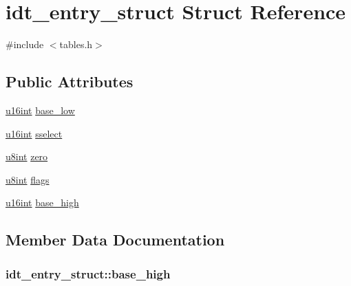 \hypertarget{structidt__entry__struct}{}\section{idt\+\_\+entry\+\_\+struct Struct Reference}
\label{structidt__entry__struct}


{\ttfamily \#include $<$tables.\+h$>$}

\subsection*{Public Attributes}
\begin{DoxyCompactItemize}
\item 
\hyperlink{system_8h_a863d9497073aad2b991aeab2211d87af}{u16int} \hyperlink{structidt__entry__struct_aefa75d6bfe07f1f544393b4dbccb3e76}{base\+\_\+low}
\item 
\hyperlink{system_8h_a863d9497073aad2b991aeab2211d87af}{u16int} \hyperlink{structidt__entry__struct_a85254c7df6a612f4a4b3bb470ff3370c}{sselect}
\item 
\hyperlink{system_8h_a1026e682ffdadc1701c42cd44ce9efcf}{u8int} \hyperlink{structidt__entry__struct_a0d33c8509ae77d42e680d8d11b4c8035}{zero}
\item 
\hyperlink{system_8h_a1026e682ffdadc1701c42cd44ce9efcf}{u8int} \hyperlink{structidt__entry__struct_a46c92bd8f07d5ff4e379a07b293c46af}{flags}
\item 
\hyperlink{system_8h_a863d9497073aad2b991aeab2211d87af}{u16int} \hyperlink{structidt__entry__struct_a1c6a29cae5ea9a832cf4261aaa5b43d0}{base\+\_\+high}
\end{DoxyCompactItemize}


\subsection{Member Data Documentation}
\hypertarget{structidt__entry__struct_a1c6a29cae5ea9a832cf4261aaa5b43d0}{}
\subsubsection[{base\+\_\+high}]{ idt\+\_\+entry\+\_\+struct\+::base\+\_\+high}\label{structidt__entry__struct_a1c6a29cae5ea9a832cf4261aaa5b43d0}
\hypertarget{structidt__entry__struct_aefa75d6bfe07f1f544393b4dbccb3e76}{}
